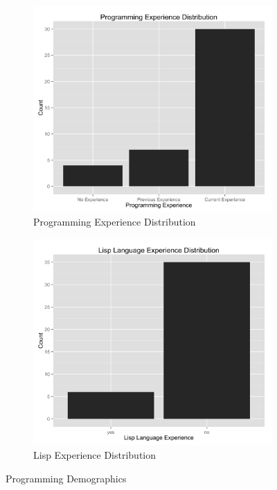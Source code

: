 \documentclass{article}
\begin{document}
\begin{figure}[t]
\centering
\begin{subfigure}{.5\textwidth}
    \centering
    \includegraphics[width=1.0\linewidth]{graphs/programming.png}
    \caption{Programming Experience Distribution}
    \label{programmingdistribution}
\end{subfigure}%
\begin{subfigure}{.5\textwidth}
    \centering
    \includegraphics[width=1.0\linewidth]{graphs/lisp.png}
    \caption{Lisp Experience Distribution}
    \label{lispdistribution}
\end{subfigure}
\caption{Programming Demographics}
\end{figure}
\end{document}
